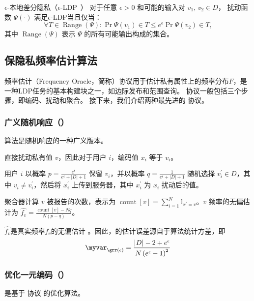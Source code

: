 \begin{definition}{$\epsilon$-本地差分隐私（$\epsilon$-LDP~\cite{kasiviswanathan2011can}）} 
    对于任意 $\epsilon > 0$ 和可能的输入对 $v_1$, $v_2 \in D$，
    扰动函数 $\Psi(\cdot)$ 满足$\epsilon$-LDP当且仅当：
    \begin{equation}
        \forall T \in \operatorname{Range}(\Psi): \Pr{\Psi\left(v_{1}\right) \in T} \leq e^{\epsilon} \Pr {\Psi\left(v_{2}\right) \in T},  \nonumber
    \end{equation}
    其中 $\operatorname{Range}(\Psi)$ 表示 $\Psi$ 的所有可能输出构成的集合。
\end{definition}

\subsection{保隐私频率估计算法}
频率估计（Frequency Oracle，简称\fo）协议用于估计私有属性上的频率分布$F$，是一种LDP任务的基本构建块之一，如边际发布\cite{zhang2018calm}和范围查询\cite{wang2019answering, cormode2019answering}。
\fo 协议一般包括三个步骤，即编码、扰动和聚合\cite{wang2017locally}。
接下来，我们介绍两种最先进的 \fo 协议。 

\subsubsection{广义随机响应（\grr）}
\grr 算法是随机响应\cite{warner1965randomized}的一种广义版本。

 \grr 直接扰动私有值 $v$，因此对于用户 $i$，编码值 $x_i$ 等于 $v_i$。

 用户 $i$ 以概率 $p = \frac{e^{\epsilon}}{e^{\epsilon}+|D|+1}$ 保留 $v_i$，并以概率 $q=\frac{1}{e^{\epsilon}+|D|+1}$ 随机选择 $v_i^{\prime} \in D$，其中 $v_i \neq v_i^{\prime}$，然后将 $x_i^{\prime}$ 上传到服务器，其中 $x_i^{\prime}$ 为 $x_i$ 扰动后的值。

 聚合器计算 $v$ 被报告的次数，表示为 $\operatorname{count}[v] = \sum_{i = 1}^{N} \mathbb{I}_{{x^{\prime}=v}}$。$v$ 频率的无偏估计为
$\hat{f_v} = \frac{\operatorname{count}[v]- Nq}{N(p-q)}$。

$\hat{f_v}$是真实频率$f_v$的无偏估计 \cite{wang2019answering}。因此，\grr 的估计误差源自于算法统计方差，即
\begin{equation}
\myvar_{\grr(\epsilon)} = \frac{|D| - 2 + e^{\epsilon}}{N\left(e^{\epsilon}-1\right)^{2}}
\label{GRRVAR}
\end{equation}

\subsubsection{优化一元编码（\oue）}
\label{myoue}
\oue \cite{wang2017locally} 是基于 \rappor 协议\cite{erlingsson2014rappor} 的优化算法。

